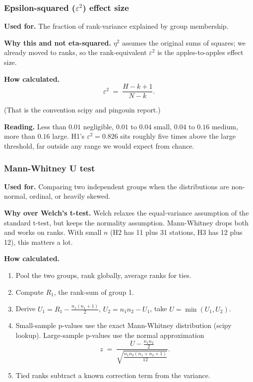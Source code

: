 \subsubsection{Epsilon-squared \texorpdfstring{($\varepsilon^2$)}{} effect size}

\textbf{Used for.} The fraction of rank-variance explained by group
membership.

\textbf{Why this and not eta-squared.} $\eta^2$ assumes the original
sums of squares; we already moved to ranks, so the rank-equivalent
$\varepsilon^2$ is the apples-to-apples effect size.

\textbf{How calculated.}
\begin{equation*}
 \varepsilon^2 \;=\; \frac{H - k + 1}{N - k}.
\end{equation*}

(That is the convention scipy and pingouin report.)

\textbf{Reading.} Less than $0.01$ negligible, $0.01$ to $0.04$ small,
$0.04$ to $0.16$ medium, more than $0.16$ large. H1's
$\varepsilon^2 = 0.826$ sits roughly five times above the large
threshold, far outside any range we would expect from chance.

\subsubsection{Mann-Whitney U test}

\textbf{Used for.} Comparing two independent groups when the
distributions are non-normal, ordinal, or heavily skewed.

\textbf{Why over Welch's t-test.} Welch relaxes the equal-variance
assumption of the standard t-test, but keeps the normality assumption.
Mann-Whitney drops both and works on ranks. With small $n$ (H2 has
11 plus 31 stations, H3 has 12 plus 12), this matters a lot.

\textbf{How calculated.}

\begin{enumerate}
 \item Pool the two groups, rank globally, average ranks for ties.
 \item Compute $R_1$, the rank-sum of group 1.
 \item Derive $U_1 = R_1 - \tfrac{n_1(n_1+1)}{2}$,
 $U_2 = n_1 n_2 - U_1$, take $U = \min(U_1, U_2)$.
 \item Small-sample p-values use the exact Mann-Whitney distribution
 (scipy lookup). Large-sample p-values use the normal
 approximation
 \begin{equation*}
 z \;=\; \frac{U - \tfrac{n_1 n_2}{2}}
 {\sqrt{\tfrac{n_1 n_2 (n_1+n_2+1)}{12}}}.
 \end{equation*}
 \item Tied ranks subtract a known correction term from the variance.
\end{enumerate}

